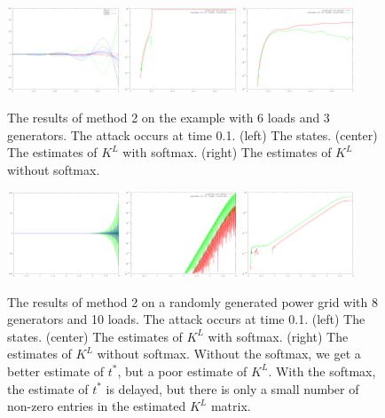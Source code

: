 \documentclass{article}
\begin{document}
\begin{figure}[T]
\includegraphics[width=0.3\textwidth]{example1-states}
\includegraphics[width=0.3\textwidth]{example1-K_L}
\includegraphics[width=0.3\textwidth]{example1-K_L-raw}
\caption{
    The results of method 2 on the example with 6 loads and 3 generators.
    The attack occurs at time 0.1.
    (left) The states.
    (center) The estimates of $K^L$ with softmax.
    (right) The estimates of $K^L$ without softmax.
}
\end{figure}

\begin{figure}[T]
\includegraphics[width=0.3\textwidth]{random-8x10x25-states}
\includegraphics[width=0.3\textwidth]{random-8x10x25-K_L}
\includegraphics[width=0.3\textwidth]{random-8x10x25-K_L-raw}
\caption{
    The results of method 2 on a randomly generated power grid with 8 generators and 10 loads.
    The attack occurs at time 0.1.
    (left) The states.
    (center) The estimates of $K^L$ with softmax.
    (right) The estimates of $K^L$ without softmax.
    Without the softmax, we get a better estimate of $t^*$, but a poor estimate of $K^L$.
    With the softmax, the estimate of $t^*$ is delayed, but there is only a small number of non-zero entries in the estimated $K^L$ matrix.
}
\end{figure}
\end{document}

